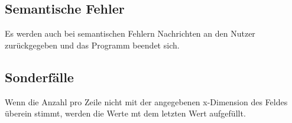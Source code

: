 \subsection{Semantische Fehler}\label{subsec:semantische-fehler-behandlung}
Es werden auch bei semantischen Fehlern Nachrichten an den Nutzer zurückgegeben und das Programm beendet sich.

\subsection{Sonderfälle}\label{subsec:sonderfaelle}
Wenn die Anzahl pro Zeile nicht mit der angegebenen x-Dimension des Feldes überein stimmt, werden die Werte mt dem letzten Wert aufgefüllt.
